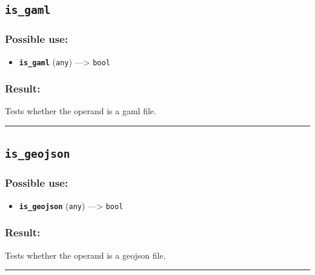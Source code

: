 \documentclass[]{book}
\providecommand{\tightlist}{%
  \setlength{\itemsep}{0pt}\setlength{\parskip}{0pt}}
\theoremstyle{definition}
\theoremstyle{definition}
\theoremstyle{definition}
\theoremstyle{remark}
\begin{document}
\subsection{\texorpdfstring{\texttt{is\_gaml}}{is\_gaml}}\label{is_gaml}

\subsubsection{Possible use:}\label{possible-use-289}

\begin{itemize}
\tightlist
\item
  \textbf{\texttt{is\_gaml}} (\texttt{any}) ---\textgreater{}
  \texttt{bool}
\end{itemize}

\subsubsection{Result:}\label{result-279}

Tests whether the operand is a gaml file.

\begin{center}\rule{0.5\linewidth}{\linethickness}\end{center}

\subsection{\texorpdfstring{\texttt{is\_geojson}}{is\_geojson}}\label{is_geojson}

\subsubsection{Possible use:}\label{possible-use-290}

\begin{itemize}
\tightlist
\item
  \textbf{\texttt{is\_geojson}} (\texttt{any}) ---\textgreater{}
  \texttt{bool}
\end{itemize}

\subsubsection{Result:}\label{result-280}

Tests whether the operand is a geojson file.

\begin{center}\rule{0.5\linewidth}{\linethickness}\end{center}
\end{document}
